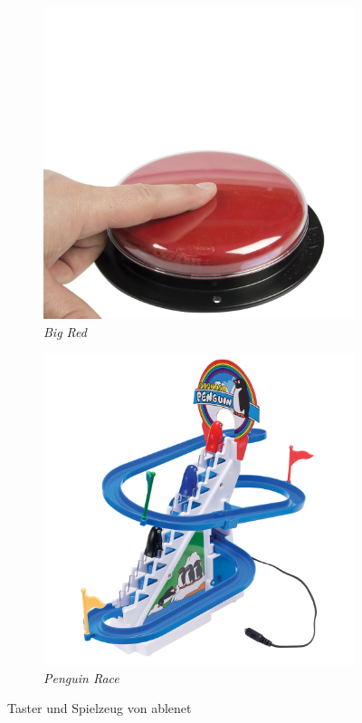             \begin{figure}[H]
				\centering
				\begin{subfigure}{.5\textwidth}
  					\centering
  					\includegraphics[width=.8\linewidth]{images/big-red-button.jpg}
  					\caption{\emph{Big Red} \cite{ablenet:bigRed}}
                    
  					\label{fig:bigRed}
				\end{subfigure}%
				\begin{subfigure}{.5\textwidth}
  					\centering
  					\includegraphics[width=.8\linewidth]{images/penguin-race.png}
  					\caption{\emph{Penguin Race} \cite{ablenet:penguinRace}}
  					\label{fig:penguinRace}
				\end{subfigure}
                \caption{Taster und Spielzeug von ablenet}
				\label{fig:ablenetSingleButtons}
			\end{figure}
            
